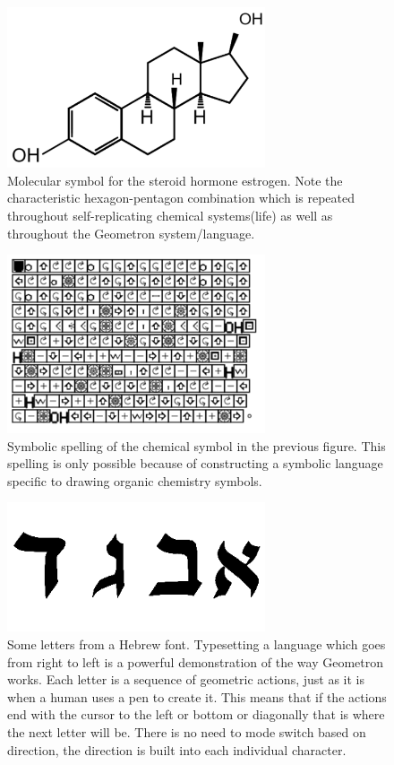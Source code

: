\begin{figure}
	\centering
	\includegraphics[width=3in]{figures/shapes/estrogendiagram.png}
	\caption[estrogendiagram]
	{Molecular symbol for the steroid hormone estrogen.  Note the characteristic hexagon-pentagon combination which is repeated throughout self-replicating chemical systems(life) as well as throughout the Geometron system/language.}
\end{figure}

\begin{figure}
	\centering
	\includegraphics[width=3in]{figures/shapes/estrogenspelling.png}
	\caption[estrogenspelling]
	{Symbolic spelling of the chemical symbol in the previous figure.  This spelling is only possible because of constructing a symbolic language specific to drawing organic chemistry symbols.}
\end{figure}

\begin{figure}
	\centering
	\includegraphics[width=3in]{figures/shapes/hebrew.png}
	\caption[hebrew]
	{Some letters from a Hebrew font. Typesetting a language which goes from right to left is a powerful demonstration of the way Geometron works.  Each letter is a sequence of geometric actions, just as it is when a human uses a pen to create it.  This means that if the actions end with the cursor to the left or bottom or diagonally that is where the next letter will be.  There is no need to mode switch based on direction, the direction is built into each individual character.}
\end{figure}


